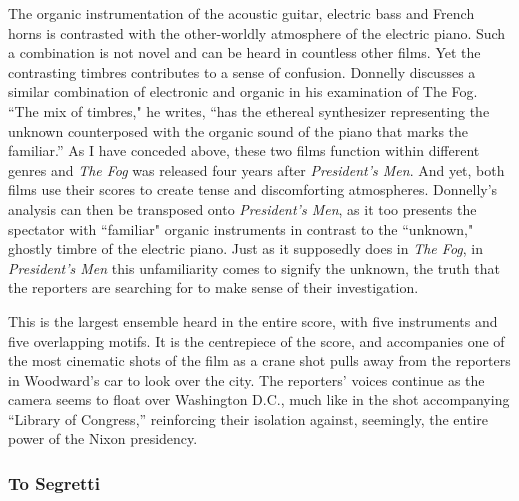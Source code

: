 The organic instrumentation of the acoustic guitar, electric bass and French horns is contrasted with the other-worldly atmosphere of the electric piano.
Such a combination is not novel and can be heard in countless other films.
Yet the contrasting timbres contributes to a sense of confusion.
Donnelly discusses a similar combination of electronic and organic in his examination of The Fog.
``The mix of timbres," he writes, ``has the ethereal synthesizer representing the unknown counterposed with the organic sound of the piano that marks the familiar.”\autocites[][156]{donnelly_hearing_2010}
As I have conceded above, these two films function within different genres and \textit{The Fog} was released four years after \textit{President's Men}.
And yet, both films use their scores to create tense and discomforting atmospheres.
Donnelly's analysis can then be transposed onto \textit{President's Men}, as it too presents the spectator with ``familiar" organic instruments in contrast to the ``unknown," ghostly timbre of the electric piano.
Just as it supposedly does in \textit{The Fog}, in \textit{President’s Men }this unfamiliarity comes to signify the unknown, the truth that the reporters are searching for to make sense of their investigation.

This is the largest ensemble heard in the entire score, with five instruments and five overlapping motifs.
It is the centrepiece of the score, and accompanies one of the most cinematic shots of the film as a crane shot pulls away from the reporters in Woodward's car to look over the city.
The reporters' voices continue as the camera seems to float over Washington D.C., much like in the shot accompanying ``Library of Congress,” reinforcing their isolation against, seemingly, the entire power of the Nixon presidency.

\subsubsection{To Segretti}

